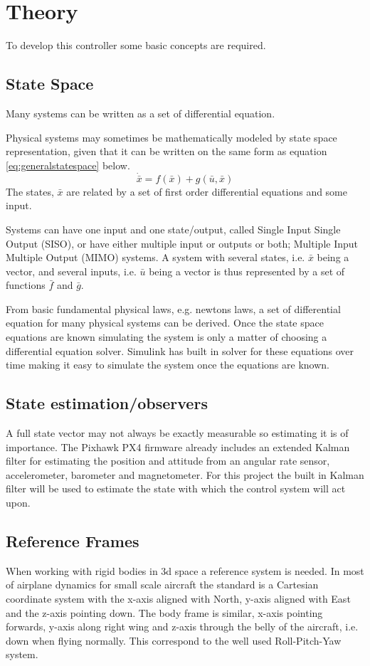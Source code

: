 \documentclass{article}
\begin{document}
\section{Theory}
To develop this controller some basic concepts are required.
\subsection{State Space}
Many systems can be written as a set of differential equation.

Physical systems may sometimes be mathematically modeled by state space representation, given that it can be written on the same form as equation \ref{eq:generalstatespace} below.
\begin{equation}
    \dot{\bar{x}} = f(\bar{x}) + g(\bar{u},\bar{x})
    \label{eq:generalstatespace}
\end{equation}
The states, $\bar{x}$ are related by a set of first order differential equations and some input.

Systems can have one input and one state/output, called Single Input Single Output (SISO), or have either multiple input or outputs or both; Multiple Input Multiple Output (MIMO) systems.
A system with several states, i.e. $\bar{x}$ being a vector, and several inputs, i.e. $\bar{u}$ being a vector is thus represented by a set of functions $\bar{f}$ and $\bar{g}$.

From basic fundamental physical laws, e.g. newtons laws, a set of differential equation for many physical systems can be derived.
Once the state space equations are known simulating the system is only a matter of choosing a differential equation solver.
Simulink has built in solver for these equations over time making it easy to simulate the system once the equations are known.

\subsection{State estimation/observers}
A full state vector may not always be exactly measurable so estimating it is of importance.
The Pixhawk PX4 firmware already includes an extended Kalman filter for estimating the position and attitude from an angular rate sensor, accelerometer, barometer and magnetometer.
For this project the built in Kalman filter will be used to estimate the state with which the control system will act upon.

\subsection{Reference Frames}
When working with rigid bodies in 3d space a reference system is needed.
In most of airplane dynamics for small scale aircraft the standard is a Cartesian coordinate system with the x-axis aligned with North, y-axis aligned with East and the z-axis pointing down.
The body frame is similar, x-axis pointing forwards, y-axis along right wing and z-axis through the belly of the aircraft, i.e. down when flying normally.
This correspond to the well used Roll-Pitch-Yaw system.\cite{nelson}
\end{document}
